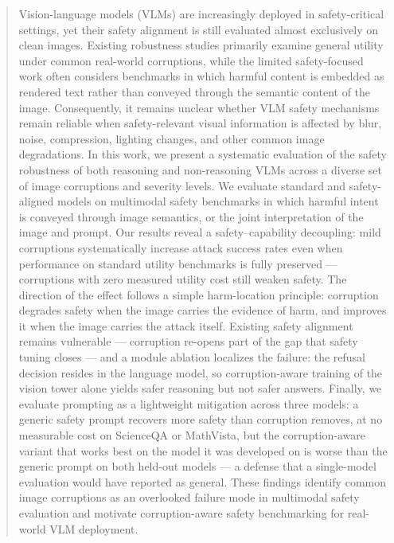 \begin{abstract}
Vision-language models (VLMs) are increasingly deployed in safety-critical settings, yet their safety alignment is still evaluated almost exclusively on clean images. Existing robustness studies primarily examine general utility under common real-world corruptions, while the limited safety-focused work often considers benchmarks in which harmful content is embedded as rendered text rather than conveyed through the semantic content of the image. Consequently, it remains unclear whether VLM safety mechanisms remain reliable when safety-relevant visual information is affected by blur, noise, compression, lighting changes, and other common image degradations. In this work, we present a systematic evaluation of the safety robustness of both reasoning and non-reasoning VLMs across a diverse set of image corruptions and severity levels. We evaluate standard and safety-aligned models on multimodal safety benchmarks in which harmful intent is conveyed through image semantics, or the joint interpretation of the image and prompt. %
Our results reveal a safety–capability decoupling: mild corruptions systematically increase attack success rates even when performance on standard utility benchmarks is fully preserved --- corruptions with zero measured utility cost still weaken safety. The direction of the effect follows a simple harm-location principle: corruption degrades safety when the image carries the evidence of harm, and improves it when the image carries the attack itself. Existing safety alignment remains vulnerable --- corruption re-opens part of the gap that safety tuning closes --- and a module ablation localizes the failure: the refusal decision resides in the language model, so corruption-aware training of the vision tower alone yields safer reasoning but not safer answers. Finally, we evaluate prompting as a lightweight mitigation across three models: a generic safety prompt recovers more safety than corruption removes, at no measurable cost on ScienceQA or MathVista, but the corruption-aware variant that works best on the model it was developed on is worse than the generic prompt on both held-out models --- a defense that a single-model evaluation would have reported as general. These findings identify common image corruptions as an overlooked failure mode in multimodal safety evaluation and motivate corruption-aware safety benchmarking for real-world VLM deployment.

\end{abstract}
